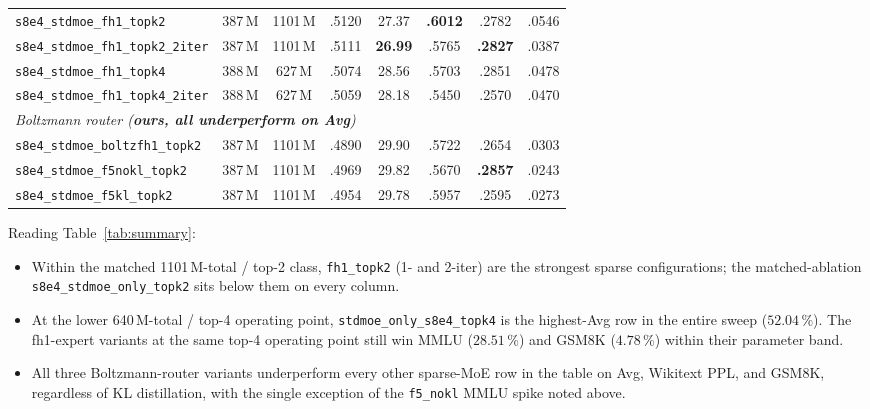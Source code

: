 \documentclass[oneside]{article}
\begin{document}
\begin{table}[t]
\begin{adjustbox}{max width=\textwidth}
\begin{tabular}{l|cc|c|c|c|c|c}
\rowcolor{green!15}
\texttt{s8e4\_stdmoe\_fh1\_topk2}          & 387\,M & 1101\,M & .5120 & 27.37 & \textbf{.6012} & .2782 & .0546 \\
\texttt{s8e4\_stdmoe\_fh1\_topk2\_2iter}   & 387\,M & 1101\,M & .5111 & \textbf{26.99} & .5765 & \textbf{.2827} & .0387 \\
\texttt{s8e4\_stdmoe\_fh1\_topk4}          & 388\,M & 627\,M  & .5074 & 28.56 & .5703 & .2851 & .0478 \\
\texttt{s8e4\_stdmoe\_fh1\_topk4\_2iter}   & 388\,M & 627\,M  & .5059 & 28.18 & .5450 & .2570 & .0470 \\
\midrule
\multicolumn{8}{l}{\emph{Boltzmann router (\textbf{ours, all underperform on Avg})}} \\
\texttt{s8e4\_stdmoe\_boltzfh1\_topk2}     & 387\,M & 1101\,M & .4890 & 29.90 & .5722 & .2654 & .0303 \\
\texttt{s8e4\_stdmoe\_f5nokl\_topk2}       & 387\,M & 1101\,M & .4969 & 29.82 & .5670 & \textbf{.2857} & .0243 \\
\texttt{s8e4\_stdmoe\_f5kl\_topk2}         & 387\,M & 1101\,M & .4954 & 29.78 & .5957 & .2595 & .0273 \\
\bottomrule
\end{tabular}
\end{adjustbox}
\end{table}

Reading Table~\ref{tab:summary}:
\begin{itemize}[leftmargin=1.5em]
  \item Within the matched 1101\,M-total / top-2 class,
        \texttt{fh1\_topk2} (1- and 2-iter) are the strongest sparse
        configurations; the matched-ablation
        \texttt{s8e4\_stdmoe\_only\_topk2} sits below them on every
        column.
  \item At the lower 640\,M-total / top-4 operating point,
        \texttt{stdmoe\_only\_s8e4\_topk4} is the highest-Avg row in
        the entire sweep ($52.04\,\%$). The fh1-expert variants at
        the same top-4 operating point still win MMLU ($28.51\,\%$)
        and GSM8K ($4.78\,\%$) within their parameter band.
  \item All three Boltzmann-router variants underperform every other
        sparse-MoE row in the table on Avg, Wikitext PPL, and GSM8K,
        regardless of KL distillation, with the single exception of
        the \texttt{f5\_nokl} MMLU spike noted above.
\end{itemize}


\end{document}
